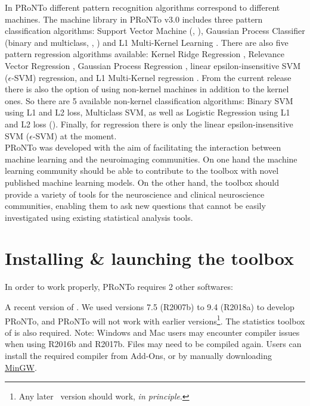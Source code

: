 In PRoNTo different pattern recognition algorithms correspond to different machines. The machine library in PRoNTo v3.0 includes three pattern classification algorithms: Support Vector Machine (\cite{Cristianini2000}, \cite{Mourao-Miranda2007}), Gaussian Process Classifier (binary and multiclass, \cite{Rasmussen2006}, \cite{Marquand2010}) and L1 Multi-Kernel Learning \cite{Rakotomamonjy2008}. There are also five pattern regression algorithms available: Kernel Ridge Regression \cite{ShaweTaylor2004}, Relevance Vector Regression \cite{Tipping2001}, Gaussian Process Regression \cite{Rasmussen2006}, linear epsilon-insensitive SVM ($\epsilon$-SVM) regression, and L1 Multi-Kernel regression \cite{Rakotomamonjy2008}. From the current release there is also the option of using non-kernel machines in addition to the kernel ones. So there are 5 available non-kernel classification algorithms: Binary SVM using L1 and L2 loss, Multiclass SVM, as well as Logistic Regression using L1 and L2 loss (\cite{chang2011libsvm, fan2008liblinear}). Finally, for regression there is only the linear epsilon-insensitive SVM ($\epsilon$-SVM) at the moment.
\\


PRoNTo was developed with the aim of facilitating the interaction between machine learning and the neuroimaging communities. On one hand the machine learning community should be able to contribute to the toolbox with novel published machine learning models. On the other hand, the toolbox should provide a variety of tools for the neuroscience and clinical neuroscience communities, enabling them to ask new questions that cannot be easily investigated using existing statistical analysis tools. 


\section{Installing \& launching the toolbox}
\label{sec:Installation}

In order to work properly, PRoNTo requires 2 other softwares:
\bi
\item A recent version of \matlab. We used versions 7.5 (R2007b) to 9.4 (R2018a) to develop PRoNTo, and PRoNTo will not work with earlier versions\footnote{Any later \matlab{}~version should work, {\it in principle}.}. The statistics toolbox of \matlab{} is also required. Note: Windows and Mac users may encounter compiler issues when using R2016b and R2017b. Files may need to be compiled again. Users can install the \matlab{} required compiler from Add-Ons, or by manually downloading \href{https://www.mingw-w64.org/}{MinGW}.

